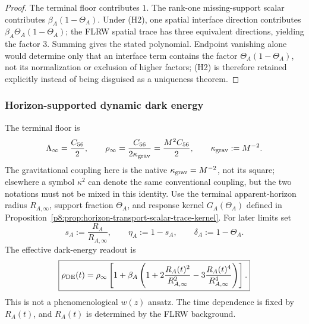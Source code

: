 \documentclass[12pt,a4paper]{article}
\begin{document}
\begin{proof}
The terminal floor contributes $1$.  The rank-one missing-support scalar contributes $\beta_A(1-\Theta_A)$.  Under (H2), one spatial interface direction contributes $\beta_A\Theta_A(1-\Theta_A)$; the FLRW spatial trace has three equivalent directions, yielding the factor $3$.  Summing gives the stated polynomial.  Endpoint vanishing alone would determine only that an interface term contains the factor $\Theta_A(1-\Theta_A)$, not its normalization or exclusion of higher factors; (H2) is therefore retained explicitly instead of being disguised as a uniqueness theorem.
\end{proof}

\subsubsection{Horizon-supported dynamic dark energy}
\label{p8:app:horizon-dynamic-de}

The terminal floor is
\begin{equation}
\label{p8:eq:hs-lambda-infty}
\Lambda_\infty=\frac{C_{56}}2,
\qquad
\rho_\infty=\frac{C_{56}}{2\kappa_{\rm grav}}
=\frac{M^2C_{56}}2,\qquad \kappa_{\rm grav}:=M^{-2}.
\end{equation}
The gravitational coupling here is the native \(\kappa_{\rm grav}=M^{-2}\),
not its square; elsewhere a symbol \(\kappa^2\) can denote the same
conventional coupling, but the two notations must not be mixed in this
identity. Use the terminal apparent-horizon radius \(R_{A,\infty}\), support fraction \(\Theta_A\), and response kernel \(G_A(\Theta_A)\) defined in Proposition~\ref{p8:prop:horizon-transport-scalar-trace-kernel}.  For later limits set
\begin{equation}
\label{p8:eq:hs-eta-delta}
s_A:=\frac{R_A}{R_{A,\infty}},
\qquad
\eta_A:=1-s_A,
\qquad
\delta_A:=1-\Theta_A.
\end{equation}
The effective dark-energy readout is
\begin{equation}
\label{p8:eq:hs-rhoDE-fixed}
    \boxed{
    \rho_{\rm DE}(t)
    =
    \rho_\infty
    \left[
    1+\beta_A\left(
    1+2\frac{R_A(t)^2}{R_{A,\infty}^2}
    -3\frac{R_A(t)^4}{R_{A,\infty}^4}
    \right)
    \right].
    }
\end{equation}
This is not a phenomenological \(w(z)\) ansatz.  The time dependence is fixed
by \(R_A(t)\), and \(R_A(t)\) is determined by the FLRW background.
\end{document}
